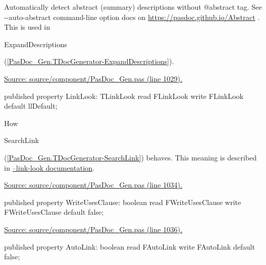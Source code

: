 \documentclass{report}
\newif\ifpdf
\begin{document}
\begin{list}{}
\begin{flushleft}
\ifpdf
\end{flushleft}
\fi


\par Automatically detect abstract (summary) descriptions without @abstract tag. See {-}{-}auto{-}abstract command{-}line option docs on \href{https://pasdoc.github.io/Abstract}{https://pasdoc.github.io/Abstract} . This is used in \begin{ttfamily}ExpandDescriptions\end{ttfamily}(\ref{PasDoc_Gen.TDocGenerator-ExpandDescriptions}).\par
\href{https://github.com/pasdoc/pasdoc/blob/master/source/component/PasDoc_Gen.pas#L1029}{Source: source/component/PasDoc{\_}Gen.pas (line 1029).}\label{PasDoc_Gen.TDocGenerator-LinkLook}
\item[\textbf{LinkLook}\hfill]
\ifpdf
\begin{flushleft}
\fi
\begin{ttfamily}
published property LinkLook: TLinkLook read FLinkLook write FLinkLook default llDefault;\end{ttfamily}

\ifpdf
\end{flushleft}
\fi


\par How \begin{ttfamily}SearchLink\end{ttfamily}(\ref{PasDoc_Gen.TDocGenerator-SearchLink}) behaves. This meaning is described in \href{https://pasdoc.github.io/LinkLookOption}{--link-look documentation}.\par
\href{https://github.com/pasdoc/pasdoc/blob/master/source/component/PasDoc_Gen.pas#L1034}{Source: source/component/PasDoc{\_}Gen.pas (line 1034).}\label{PasDoc_Gen.TDocGenerator-WriteUsesClause}
\item[\textbf{WriteUsesClause}\hfill]
\ifpdf
\begin{flushleft}
\fi
\begin{ttfamily}
published property WriteUsesClause: boolean
      read FWriteUsesClause write FWriteUsesClause default false;\end{ttfamily}

\ifpdf
\end{flushleft}
\fi


\par  \par
\href{https://github.com/pasdoc/pasdoc/blob/master/source/component/PasDoc_Gen.pas#L1036}{Source: source/component/PasDoc{\_}Gen.pas (line 1036).}\label{PasDoc_Gen.TDocGenerator-AutoLink}
\item[\textbf{AutoLink}\hfill]
\ifpdf
\begin{flushleft}
\fi
\begin{ttfamily}
published property AutoLink: boolean
      read FAutoLink write FAutoLink default false;\end{ttfamily}


\end{flushleft}
\end{list}
\end{document}

